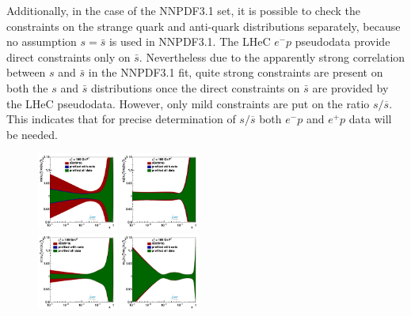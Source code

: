 \documentclass[pdftex,twocolumn,epjc3]{svjour3}          %
\newcommand\new[1]{{\color{blue} #1}}
\renewcommand\new[1]{{ #1}}
\begin{document}
\new{
Additionally, in the case of the NNPDF3.1 set, it is possible to check 
the constraints on the strange quark and anti-quark distributions 
separately, because no assumption $s=\bar{s}$ is used in NNPDF3.1. 
The LHeC $e^{-}p$ pseudodata provide direct constraints only on $\bar{s}$. 
Nevertheless due to the apparently strong correlation between $s$ and 
$\bar{s}$ in the NNPDF3.1 fit, quite strong constraints are present on both 
the $s$ and $\bar{s}$ distributions once the direct constraints on $\bar{s}$ 
are provided by the LHeC pseudodata. However, only mild constraints 
are put on the ratio $s/\overline{s}$. This indicates that for precise 
determination of $s/\overline{s}$ both $e^{-}p$ and $e^{+}p$ data will be needed.

\begin{figure}
  \centering
  {{\includegraphics[width=0.235\textwidth]{pics/pdf-profile-ffabm/q2_100_pdf_sq_ratio.pdf}}}
  {{\includegraphics[width=0.235\textwidth]{pics/pdf-profile-ffabm/q2_100_pdf_g_ratio.pdf}}}\\
  {{\includegraphics[width=0.235\textwidth]{pics/pdf-profile-ffabm/q2_100_pdf_Sea_ratio.pdf}}}
  {{\includegraphics[width=0.235\textwidth]{pics/pdf-profile-ffabm/q2_100_pdf_uv_ratio.pdf}}}

\end{figure}}
\end{document}
